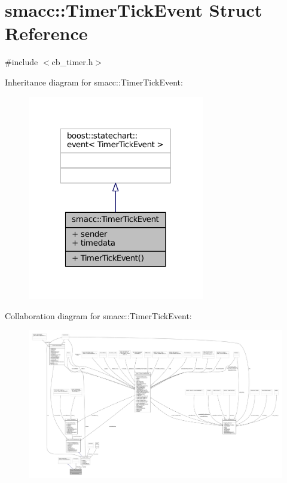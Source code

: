 \hypertarget{structsmacc_1_1TimerTickEvent}{}\section{smacc\+:\+:Timer\+Tick\+Event Struct Reference}
\label{structsmacc_1_1TimerTickEvent}


{\ttfamily \#include $<$cb\+\_\+timer.\+h$>$}



Inheritance diagram for smacc\+:\+:Timer\+Tick\+Event\+:
\nopagebreak
\begin{figure}[H]
\begin{center}
\leavevmode
\includegraphics[width=218pt]{structsmacc_1_1TimerTickEvent__inherit__graph}
\end{center}
\end{figure}


Collaboration diagram for smacc\+:\+:Timer\+Tick\+Event\+:
\nopagebreak
\begin{figure}[H]
\begin{center}
\leavevmode
\includegraphics[width=350pt]{structsmacc_1_1TimerTickEvent__coll__graph}
\end{center}
\end{figure}
